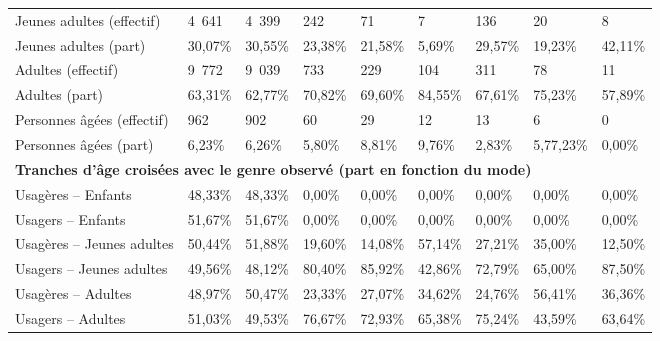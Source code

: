 \begin{longtable}{p{3.7cm}p{0.9cm}p{0.9cm}p{0.9cm}p{0.9cm}p{0.9cm}p{0.9cm}p{0.9cm}p{0.9cm}}
    \small{Jeunes adultes (effectif)} & \small{4~641} & \small{4~399} & \small{242} & \small{71} & \small{7} & \small{136} & \small{20} & \small{8}\\
    \small{Jeunes adultes (part)} & \small{30,07\%} & \small{30,55\%} & \small{23,38\%} & \small{21,58\%} & \small{5,69\%} & \small{29,57\%} & \small{19,23\%} & \small{42,11\%}\\
    \small{Adultes (effectif)} & \small{9~772} & \small{9~039} & \small{733} & \small{229} & \small{104} & \small{311} & \small{78} & \small{11}\\
    \small{Adultes (part)} & \small{63,31\%} & \small{62,77\%} & \small{70,82\%} & \small{69,60\%} & \small{84,55\%} & \small{67,61\%} & \small{75,23\%} & \small{57,89\%}\\
    \small{Personnes âgées (effectif)} & \small{962} & \small{902} & \small{60} & \small{29} & \small{12} & \small{13} & \small{6} & \small{0}\\
    \small{Personnes âgées (part)} & \small{6,23\%} & \small{6,26\%} & \small{5,80\%} & \small{8,81\%} & \small{9,76\%} & \small{2,83\%} & \small{5,77,23\%} & \small{0,00\%}\\
    \hline
\multicolumn{9}{l}{\textbf{Tranches d'âge croisées avec le genre observé (part en fonction du mode)}}\\
    \small{Usagères – Enfants} & \small{48,33\%} & \small{48,33\%} & \small{0,00\%} & \small{0,00\%} & \small{0,00\%} & \small{0,00\%} & \small{0,00\%} & \small{0,00\%}\\
    \small{Usagers – Enfants} & \small{51,67\%} & \small{51,67\%} & \small{0,00\%} & \small{0,00\%} & \small{0,00\%} & \small{0,00\%} & \small{0,00\%} & \small{0,00\%}\\
    \small{Usagères – Jeunes adultes} & \small{50,44\%} & \small{51,88\%} & \small{19,60\%} & \small{14,08\%} & \small{57,14\%} & \small{27,21\%} & \small{35,00\%} & \small{12,50\%}\\
    \small{Usagers – Jeunes adultes} & \small{49,56\%} & \small{48,12\%} & \small{80,40\%} & \small{85,92\%} & \small{42,86\%} & \small{72,79\%} & \small{65,00\%} & \small{87,50\%}\\
    \small{Usagères – Adultes} & \small{48,97\%} & \small{50,47\%} & \small{23,33\%} & \small{27,07\%} & \small{34,62\%} & \small{24,76\%} & \small{56,41\%} & \small{36,36\%}\\
    \small{Usagers – Adultes} & \small{51,03\%} & \small{49,53\%} & \small{76,67\%} & \small{72,93\%} & \small{65,38\%} & \small{75,24\%} & \small{43,59\%} & \small{63,64\%}\\

\end{longtable}
